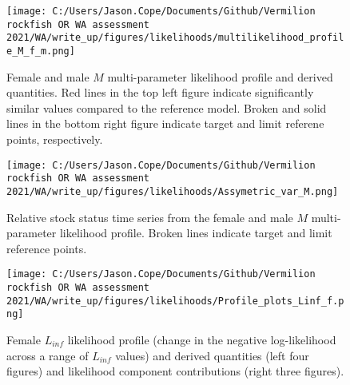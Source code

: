 \documentclass[11pt,
  english,
  a4paper,
]{article}
\begin{document}
\tagmcend\tagstructend


\begin{figure}
\centering
\texttt{[image: C:/Users/Jason.Cope/Documents/Github/Vermilion rockfish OR WA assessment 2021/WA/write\_up/figures/likelihoods/multilikelihood\_profile\_M\_f\_m.png]}
\caption{Female and male {\(M\)\leavevmode\tagmcend\tagstructend} multi-parameter likelihood profile and derived quantities. Red lines in the top left figure indicate significantly similar values compared to the reference model. Broken and solid lines in the bottom right figure indicate target and limit referene points, respectively.\label{fig:M-multiprofile-combo}}
\end{figure}

\tagmcend\tagstructend


\begin{figure}
\centering
\texttt{[image: C:/Users/Jason.Cope/Documents/Github/Vermilion rockfish OR WA assessment 2021/WA/write\_up/figures/likelihoods/Assymetric\_var\_M.png]}
\caption{Relative stock status time series from the female and male {\(M\)\leavevmode\tagmcend\tagstructend} multi-parameter likelihood profile. Broken lines indicate target and limit reference points.\label{fig:M-multiprofile-Bratio}}
\end{figure}

\tagmcend\tagstructend


\begin{figure}
\centering
\texttt{[image: C:/Users/Jason.Cope/Documents/Github/Vermilion rockfish OR WA assessment 2021/WA/write\_up/figures/likelihoods/Profile\_plots\_Linf\_f.png]}
\caption{Female {\(L_{inf}\)\leavevmode\tagmcend\tagstructend} likelihood profile (change in the negative log-likelihood across a range of {\(L_{inf}\)\leavevmode\tagmcend\tagstructend} values) and derived quantities (left four figures) and likelihood component contributions (right three figures).\label{fig:Linf_F-profile-combo}}
\end{figure}
\end{document}
